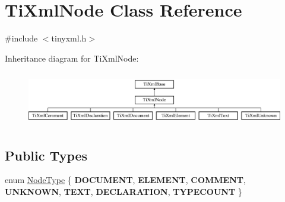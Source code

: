\hypertarget{classTiXmlNode}{
\section{\-Ti\-Xml\-Node \-Class \-Reference}
\label{d3/dd5/classTiXmlNode}
}


{\ttfamily \#include $<$tinyxml.\-h$>$}

\-Inheritance diagram for \-Ti\-Xml\-Node\-:\begin{figure}[H]
\begin{center}
\leavevmode
\includegraphics[height=2.413793cm]{d3/dd5/classTiXmlNode}
\end{center}
\end{figure}
\subsection*{\-Public \-Types}
\begin{DoxyCompactItemize}
\item 
enum \hyperlink{classTiXmlNode_a836eded4920ab9e9ef28496f48cd95a2}{\-Node\-Type} \{ \*
{\bfseries \-D\-O\-C\-U\-M\-E\-N\-T}, 
{\bfseries \-E\-L\-E\-M\-E\-N\-T}, 
{\bfseries \-C\-O\-M\-M\-E\-N\-T}, 
{\bfseries \-U\-N\-K\-N\-O\-W\-N}, 
\*
{\bfseries \-T\-E\-X\-T}, 
{\bfseries \-D\-E\-C\-L\-A\-R\-A\-T\-I\-O\-N}, 
{\bfseries \-T\-Y\-P\-E\-C\-O\-U\-N\-T}
 \}
\end{DoxyCompactItemize}
